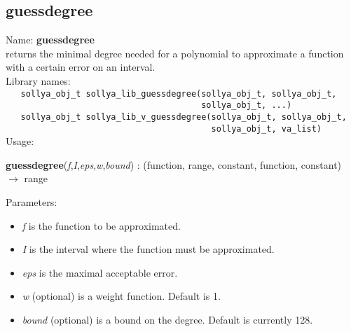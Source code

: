 \subsection{guessdegree}
\label{labguessdegree}
\noindent Name: \textbf{guessdegree}\\
\phantom{aaa}returns the minimal degree needed for a polynomial to approximate a function with a certain error on an interval.\\[0.2cm]
\noindent Library names:\\
\verb|   sollya_obj_t sollya_lib_guessdegree(sollya_obj_t, sollya_obj_t,|\\
\verb|                                       sollya_obj_t, ...)|\\
\verb|   sollya_obj_t sollya_lib_v_guessdegree(sollya_obj_t, sollya_obj_t,|\\
\verb|                                         sollya_obj_t, va_list)|\\[0.2cm]
\noindent Usage: 
\begin{center}
\textbf{guessdegree}(\emph{f},\emph{I},\emph{eps},\emph{w},\emph{bound}) : (\textsf{function}, \textsf{range}, \textsf{constant}, \textsf{function}, \textsf{constant}) $\rightarrow$ \textsf{range}\\
\end{center}
Parameters: 
\begin{itemize}
\item \emph{f} is the function to be approximated.
\item \emph{I} is the interval where the function must be approximated.
\item \emph{eps} is the maximal acceptable error.
\item \emph{w} (optional) is a weight function. Default is 1.
\item \emph{bound} (optional) is a bound on the degree. Default is currently 128.
\end{itemize}

